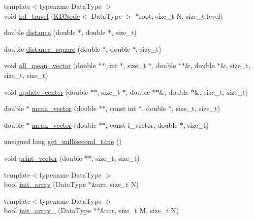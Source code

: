 \begin{DoxyCompactItemize}
{\footnotesize template$<$typename Data\-Type $>$ }\\void \hyperlink{namespaceSimpleCluster_addb0a17c2b98fa9a4847e598dac6971a}{kd\-\_\-travel} (\hyperlink{classSimpleCluster_1_1KDNode}{K\-D\-Node}$<$ Data\-Type $>$ $\ast$root, size\-\_\-t N, size\-\_\-t level)
\item 
double \hyperlink{namespaceSimpleCluster_a32994022b5f131b488b98d00fdb40a1f}{distance} (double $\ast$, double $\ast$, size\-\_\-t)
\item 
double \hyperlink{namespaceSimpleCluster_a2b7cf8225bcc829f7f0717292d49e0f0}{distance\-\_\-square} (double $\ast$, double $\ast$, size\-\_\-t)
\item 
void \hyperlink{namespaceSimpleCluster_a5f88fe7b4c442430fed84643d9ff83dd}{all\-\_\-mean\-\_\-vector} (double $\ast$$\ast$, int $\ast$, size\-\_\-t $\ast$, double $\ast$$\ast$\&, double $\ast$\&, size\-\_\-t, size\-\_\-t, size\-\_\-t)
\item 
void \hyperlink{namespaceSimpleCluster_a250fa0fe5d53131d30a98b0c22ce611b}{update\-\_\-center} (double $\ast$$\ast$, size\-\_\-t $\ast$, double $\ast$$\ast$\&, double $\ast$\&, size\-\_\-t, size\-\_\-t)
\item 
double $\ast$ \hyperlink{namespaceSimpleCluster_af5f08f98d4d441cb169fd228b58c4c79}{mean\-\_\-vector} (double $\ast$$\ast$, const int $\ast$, double $\ast$, size\-\_\-t, size\-\_\-t)
\item 
double $\ast$ \hyperlink{namespaceSimpleCluster_a6a6a4eba291860493d325b5b94a3a74b}{mean\-\_\-vector} (double $\ast$$\ast$, const i\-\_\-vector, double $\ast$, size\-\_\-t)
\item 
unsigned long \hyperlink{namespaceSimpleCluster_a00c790e51730b0e775438fe6c5ccc2c6}{get\-\_\-millisecond\-\_\-time} ()
\item 
void \hyperlink{namespaceSimpleCluster_ad04f5b6a882a4eea162fbf4eddc1246c}{print\-\_\-vector} (double $\ast$$\ast$, size\-\_\-t, size\-\_\-t)
\item 
{\footnotesize template$<$typename Data\-Type $>$ }\\bool \hyperlink{namespaceSimpleCluster_acc1dff4c68ab24c3054d8b0953c8f92d}{init\-\_\-array} (Data\-Type $\ast$\&arr, size\-\_\-t N)
\item 
{\footnotesize template$<$typename Data\-Type $>$ }\\bool \hyperlink{namespaceSimpleCluster_a3e85bbadb909b189b987f27b841ca220}{init\-\_\-array\-\_} (Data\-Type $\ast$$\ast$\&arr, size\-\_\-t M, size\-\_\-t N)
\item 

\end{DoxyCompactItemize}
